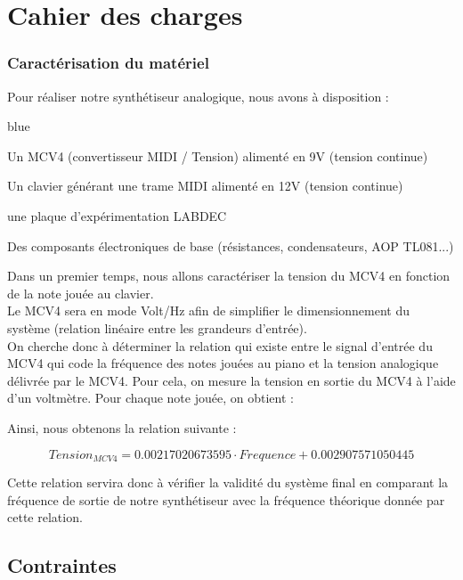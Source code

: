 
\chapter{Cahier des charges}

\subsection{Caractérisation du matériel}

Pour réaliser notre synthétiseur analogique, nous avons à disposition  :


\begin{items}{blue}{\Bullet}
    \item Un MCV4 (convertisseur MIDI / Tension) alimenté en 9V (tension continue)
    \item Un clavier générant une trame MIDI alimenté en 12V (tension continue)
    \item une plaque d’expérimentation LABDEC
    \item Des composants électroniques de base (résistances, condensateurs, AOP TL081...)
\end{items}

Dans un premier temps, nous allons caractériser la tension du MCV4 en fonction de la note jouée au clavier.\\
 Le MCV4 sera en mode Volt/Hz afin de simplifier le dimensionnement du système (relation linéaire entre les grandeurs d’entrée). \\

On cherche donc à déterminer la relation qui existe entre le signal d’entrée du MCV4 qui code la fréquence des notes jouées au piano et la 
tension analogique délivrée par le MCV4. Pour cela, on mesure la tension en sortie du MCV4 à l’aide d’un voltmètre. Pour chaque note jouée, on obtient :




Ainsi, nous obtenons la relation suivante : 


$$ Tension_{MCV4} =0.00217020673595 \cdot Frequence + 0.002907571050445 $$ 


Cette relation servira donc à vérifier la validité du système final en comparant la fréquence de sortie de notre 
synthétiseur avec la fréquence théorique donnée par cette relation.\\

\section{Contraintes}

